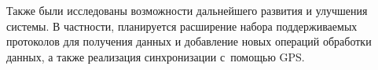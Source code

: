 \documentclass[a4paper, 14pt]{extarticle}
\begin{document}
  Также были исследованы возможности дальнейшего развития и улучшения системы. В частности,
  планируется расширение набора поддерживаемых протоколов для получения данных и добавление новых
  операций обработки данных, а также реализация синхронизации с~помощью GPS.


  \begin{flushleft}
    
  \end{flushleft}
\end{document}
